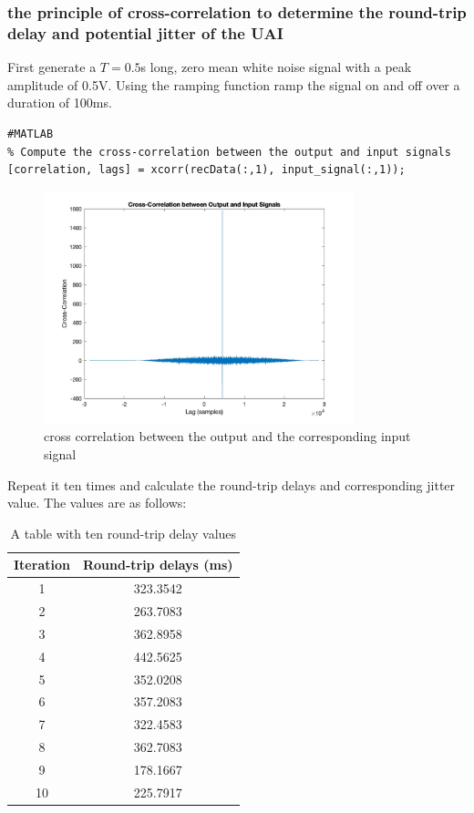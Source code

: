 \documentclass[
	a4paper,
	11pt,
]{article}
\begin{document}
\subsubsection{the principle of cross-correlation to determine the round-trip delay and potential jitter of the UAI}
First generate a \(T = 0.5\)s long, zero mean white noise signal with a peak amplitude of 0.5V. Using the ramping function ramp the signal on and off over a duration of 100ms.

\begin{verbatim}
#MATLAB
% Compute the cross-correlation between the output and input signals
[correlation, lags] = xcorr(recData(:,1), input_signal(:,1));
\end{verbatim}

\begin{figure}[htb!]
    \centerline{\includegraphics[width=9cm]{4_img/4(a).jpg}}
     \caption[ cross correlation between the output and the corresponding input signal ]
        {\small cross correlation between the output and the corresponding input signal}
\end{figure}

Repeat it ten times and calculate the round-trip delays and corresponding jitter value.
The values are as follows:

\begin{table}[ht]
\centering
\begin{tabular}{ c c }
\hline
Iteration & Round-trip delays (ms) \\
\hline
1 & 323.3542 \\
2 & 263.7083 \\
3 & 362.8958 \\
4 & 442.5625 \\
5 & 352.0208 \\
6 & 357.2083 \\
7 & 322.4583 \\
8 & 362.7083 \\
9 & 178.1667 \\
10 & 225.7917 \\
\hline
\end{tabular}
\caption{A table with ten round-trip delay values}
\label{tab:ten-values}
\end{table}
\end{document}
